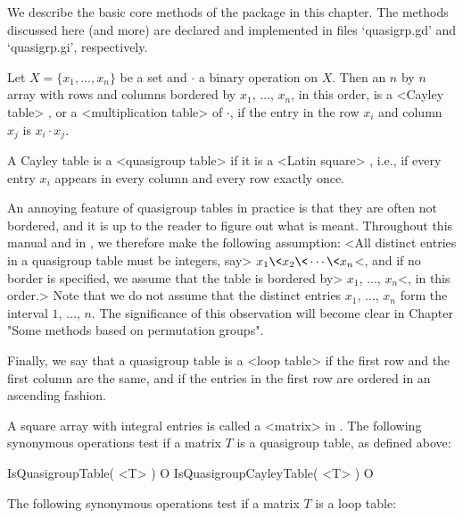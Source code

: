 
We describe the basic core methods of the {\LOOPS} package in this chapter. The
methods discussed here (and more) are declared and implemented in files
`quasigrp.gd' and `quasigrp.gi', respectively.


Let $X=\{x_1,\dots,x_n\}$ be a set and $\cdot$ a binary operation on $X$. Then
an $n$ by $n$ array with rows and columns bordered by $x_1$, $\dots$, $x_n$, in
this order, is a <Cayley table>
%
%
, or a <multiplication table>
%
%
 of
$\cdot$, if the entry in the row $x_i$ and column $x_j$ is $x_i\cdot x_j$.

A Cayley table is a <quasigroup table>
%
%
 if it is a <Latin square>
%
%
,
i.e., if every entry $x_i$ appears in every column and every row exactly once.

An annoying feature of quasigroup tables in practice is that they are often not
bordered, and it is up to the reader to figure out what is meant. Throughout
this manual and in {\LOOPS}, we therefore make the following assumption: <All
distinct entries in a quasigroup table must be integers, say>
$x_1\<x_2\<\cdots\<x_n$<, and if no border is specified, we assume that the
table is bordered by> $x_1$, $\dots$, $x_n$<, in this order.> Note that we do
not assume that the distinct entries $x_1$, $\dots$, $x_n$ form the interval
$1$, $\dots$, $n$. The significance of this observation will become clear in
Chapter "Some methods based on permutation groups".

Finally, we say that a quasigroup table is a <loop table>
%
%
 if the first row
and the first column are the same, and if the entries in the first row are
ordered in an ascending fashion.


A square array with integral entries is called a <matrix> in {\GAP}. The
following synonymous operations test if a matrix $T$ is a quasigroup table, as
defined above:

\>IsQuasigroupTable( <T> ) O
\>IsQuasigroupCayleyTable( <T> ) O

The following synonymous operations test if a matrix $T$ is a loop table:

